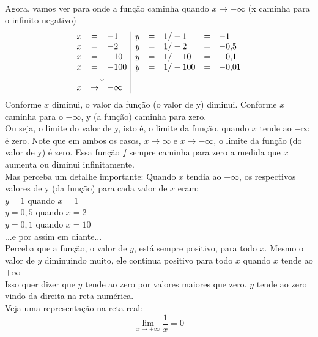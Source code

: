 \documentclass{article}
\begin{document}
\\[2pt]
Agora, vamos ver para onde a função caminha quando $x \to -\infty$ (x caminha para o infinito negativo)
\[
\begin{array}{rcl|rclcl}
x &=& -1   & y &=& 1/-1   &=& -1 \\
x &=& -2   & y &=& 1/-2   &=& -0{,}5 \\
x &=& -10  & y &=& 1/-10  &=& -0{,}1 \\
x &=& -100 & y &=& 1/-100 &=& -0{,}01 \\
\multicolumn{3}{c|}{\downarrow} & & & & & \\
x &\to& -\infty & & & & &
\end{array}
\]
Conforme $x$ diminui, o valor da função (o valor de y) diminui. Conforme $x$ caminha para o $-\infty$, y (a função) caminha para zero.
\\[2pt]
Ou seja, o limite do valor de y, isto é, o limite da função, quando $x$ tende ao $-\infty$ é zero. Note que em ambos os casos, $x \to \infty$ e $x \to -\infty$, o limite da função (do valor de y) é zero. Essa função $f$ sempre caminha para zero a medida que $x$ aumenta ou diminui infinitamente.
\\[2pt]
Mas perceba um detalhe importante: Quando $x$ tendia ao $+\infty$, os respectivos valores de y (da função) para cada valor de $x$ eram:
\\[2pt]
$y = 1$ quando $x = 1$
\\
$y = 0,5$ quando $x = 2$
\\
$y = 0,1$ quando $x = 10$
\\
...e por assim em diante...
\\[2pt]
Perceba que a função, o valor de $y$, está sempre positivo, para todo $x$. Mesmo o valor de $y$ diminuindo muito, ele continua positivo para todo $x$ quando $x$ tende ao $+\infty$
\\[2pt]
Isso quer dizer que $y$ tende ao zero por valores maiores que zero. $y$ tende ao zero vindo da direita na reta numérica.
\\[2pt]
Veja uma representação na reta real:
\[
\lim_{x\to+\infty}\frac{1}{x}=0
\]
\end{document}
